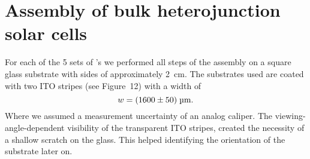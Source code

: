 \section{Assembly of bulk heterojunction solar cells}\label{sec:assembly}
For each of the 5 sets of \BHSC's we performed all steps of the assembly on a square glass substrate with sides of approximately 2~cm. The substrates used are coated with two ITO stripes (see \cite{labdesc} Figure~12) with a width of
\begin{equation*}
w = (1600\pm50)\;\text{\textmu m}.
\end{equation*}
Where we assumed a measurement uncertainty of an analog caliper. The viewing-angle-dependent visibility of the transparent ITO stripes, created the necessity of a shallow scratch on the glass. This helped identifying the orientation of the substrate later on.





